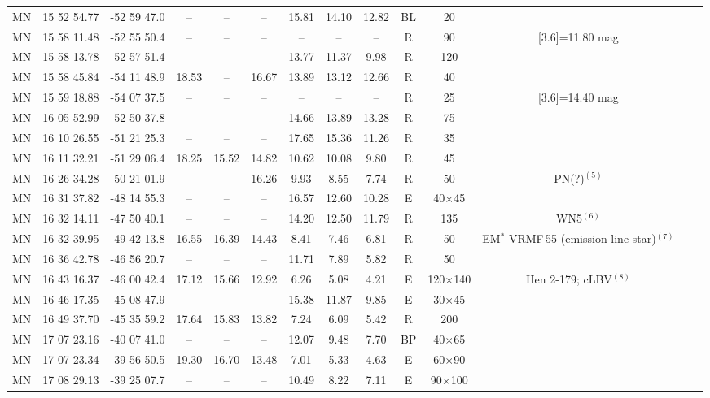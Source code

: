 \documentclass[useAMS]{mn2e}
\newcounter{qub}
\newcommand{\qq}{\addtocounter{qub}{1}\arabic{qub}}
\begin{document}
\begin{table*}
\begin{tabular}{lccccccccccccc}
MN\qq & 15 52 54.77 & -52 59 47.0 & -- & -- & -- & 15.81 & 14.10 & 12.82 & BL & 20 &  \\
MN\qq & 15 58 11.48 & -52 55 50.4 & -- & -- & -- & -- & -- & -- & R & 90 & [3.6]=11.80 mag \\
MN\qq & 15 58 13.78 & -52 57 51.4 & -- & -- & -- & 13.77 & 11.37 & 9.98 & R & 120 &  \\
MN\qq & 15 58 45.84 & -54 11 48.9 & 18.53 & -- & 16.67 & 13.89 & 13.12 & 12.66 & R & 40 & \\
MN\qq & 15 59 18.88 & -54 07 37.5 & -- & -- & -- & -- & -- & -- & R & 25 & [3.6]=14.40 mag \\
MN\qq & 16 05 52.99 & -52 50 37.8 & -- & -- & -- & 14.66 & 13.89 & 13.28 & R & 75 & \\
MN\qq & 16 10 26.55 & -51 21 25.3 & -- & -- & -- & 17.65 & 15.36 & 11.26 & R & 35 &  \\
MN\qq & 16 11 32.21 & -51 29 06.4 & 18.25 & 15.52 & 14.82 & 10.62 & 10.08 & 9.80 & R & 45 &  \\
MN\qq & 16 26 34.28 & -50 21 01.9 & -- & -- & 16.26 & 9.93 & 8.55 & 7.74 & R & 50 & PN(?)$^{(5)}$ \\
MN\qq & 16 31 37.82 & -48 14 55.3 & -- & -- & -- & 16.57 & 12.60 & 10.28 & E & 40$\times$45 & \\
MN\qq & 16 32 14.11 & -47 50 40.1 & -- & -- & -- & 14.20 & 12.50 & 11.79 & R & 135 & WN5$^{(6)}$ \\
MN\qq & 16 32 39.95 & -49 42 13.8 & 16.55 & 16.39 & 14.43 & 8.41 & 7.46 & 6.81 & R & 50 & EM$^*$ VRMF\,55 (emission line star)$^{(7)}$ \\
MN\qq & 16 36 42.78 & -46 56 20.7 & -- & -- & -- & 11.71 & 7.89 &  5.82 & R & 50 & \\
MN\qq & 16 43 16.37 & -46 00 42.4 & 17.12 & 15.66 & 12.92 & 6.26 & 5.08 & 4.21 & E & 120$\times$140 & Hen 2-179; cLBV$^{(8)}$ \\
MN\qq & 16 46 17.35 & -45 08 47.9 & -- & -- & -- & 15.38 & 11.87 & 9.85 & E & 30$\times$45 & \\
MN\qq & 16 49 37.70 & -45 35 59.2 & 17.64 & 15.83 & 13.82 & 7.24 & 6.09 & 5.42 & R & 200 &  \\
MN\qq & 17 07 23.16 & -40 07 41.0 & -- & -- & -- & 12.07 & 9.48 & 7.70 & BP & 40$\times$65 &  \\
MN\qq & 17 07 23.34 & -39 56 50.5 & 19.30 & 16.70 & 13.48 & 7.01 & 5.33 & 4.63 & E & 60$\times$90 &  \\
MN\qq & 17 08 29.13 & -39 25 07.7 & -- & -- & -- & 10.49 & 8.22 & 7.11 & E & 90$\times$100 &  \\

\end{tabular}
\end{table*}
\end{document}
